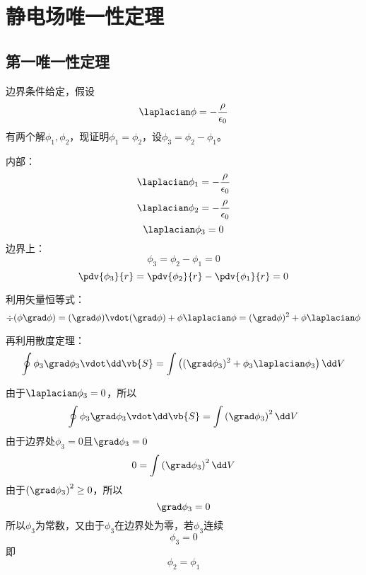 
\section{静电场唯一性定理}%
\subsection{第一唯一性定理}%
边界条件给定，假设
\begin{equation*}
	\laplacian \phi = - \frac{\rho}{\epsilon_0}
\end{equation*}
有两个解\(\phi_1, \phi_2\)，现证明\(\phi_1 = \phi_2\)，设\(\phi_3 = \phi_2 - \phi_1\)。

内部：
\begin{equation*}
	\laplacian \phi_1 = - \frac{\rho}{\epsilon_0}
\end{equation*}
\begin{equation*}
	\laplacian \phi_2 = - \frac{\rho}{\epsilon_0}
\end{equation*}
\begin{equation*}
	\laplacian \phi_3 = 0
\end{equation*}
边界上：
\begin{equation}
\phi_3 = \phi_2 - \phi_1 = 0
\end{equation}
\begin{equation*}
	\pdv{\phi_3}{r}
	=
	\pdv{\phi_2}{r}
	-
	\pdv{\phi_1}{r}
	=0
\end{equation*}

利用矢量恒等式：
\begin{equation*}
	\div(\phi \grad \phi) 
	= 
	(\grad \phi) \vdot (\grad \phi) 
	+
	\phi \laplacian \phi
	= 
	(\grad \phi)^2
	+
	\phi \laplacian \phi
\end{equation*}

再利用散度定理：
\begin{equation*}
	\oint \phi_3 \grad \phi_3 \vdot \dd \vb{S} 
	= 
	\int
	\left( 
	(\grad \phi_3)^2
	+
	\phi_3 \laplacian \phi_3\right)
	\dd V
\end{equation*}

由于\(\laplacian \phi_3=0\)，所以
\begin{equation*}
	\oint \phi_3 \grad \phi_3 \vdot \dd \vb{S} 
	= 
	\int
	\left(\grad \phi_3\right)^2
	\dd V
\end{equation*}
由于边界处\(\phi_3 = 0\)且\(\grad \phi_3 = 0\)
\begin{equation*}
0 =
	\int
	\left(\grad \phi_3\right)^2
	\dd V
\end{equation*}
由于\(	\left(\grad \phi_3\right)^2 \geq 0\)，所以
\begin{equation*}
	\grad \phi_3 = 0
\end{equation*}
所以\(\phi_3\)为常数，又由于\(\phi_3\)在边界处为零，若\(\phi_3\)连续
\begin{equation*}
	\phi_3 = 0
\end{equation*}
即
\begin{equation*}
 \phi_2 = \phi_1
\end{equation*}

